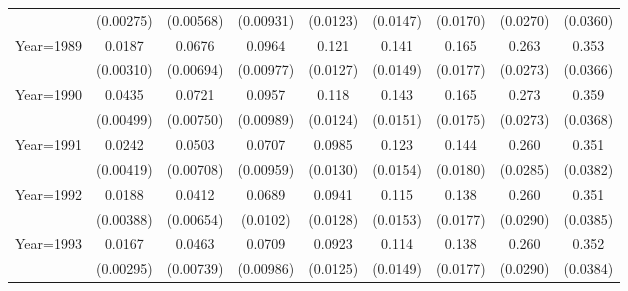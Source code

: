 \begin{table}[htbp]
\begin{tabular}{l*{8}{c}}
                    &   (0.00275)         &   (0.00568)         &   (0.00931)         &    (0.0123)         &    (0.0147)         &    (0.0170)         &    (0.0270)         &    (0.0360)         \\
[1em]
Year=1989           &      0.0187\sym{***}&      0.0676\sym{***}&      0.0964\sym{***}&       0.121\sym{***}&       0.141\sym{***}&       0.165\sym{***}&       0.263\sym{***}&       0.353\sym{***}\\
                    &   (0.00310)         &   (0.00694)         &   (0.00977)         &    (0.0127)         &    (0.0149)         &    (0.0177)         &    (0.0273)         &    (0.0366)         \\
[1em]
Year=1990           &      0.0435\sym{***}&      0.0721\sym{***}&      0.0957\sym{***}&       0.118\sym{***}&       0.143\sym{***}&       0.165\sym{***}&       0.273\sym{***}&       0.359\sym{***}\\
                    &   (0.00499)         &   (0.00750)         &   (0.00989)         &    (0.0124)         &    (0.0151)         &    (0.0175)         &    (0.0273)         &    (0.0368)         \\
[1em]
Year=1991           &      0.0242\sym{***}&      0.0503\sym{***}&      0.0707\sym{***}&      0.0985\sym{***}&       0.123\sym{***}&       0.144\sym{***}&       0.260\sym{***}&       0.351\sym{***}\\
                    &   (0.00419)         &   (0.00708)         &   (0.00959)         &    (0.0130)         &    (0.0154)         &    (0.0180)         &    (0.0285)         &    (0.0382)         \\
[1em]
Year=1992           &      0.0188\sym{***}&      0.0412\sym{***}&      0.0689\sym{***}&      0.0941\sym{***}&       0.115\sym{***}&       0.138\sym{***}&       0.260\sym{***}&       0.351\sym{***}\\
                    &   (0.00388)         &   (0.00654)         &    (0.0102)         &    (0.0128)         &    (0.0153)         &    (0.0177)         &    (0.0290)         &    (0.0385)         \\
[1em]
Year=1993           &      0.0167\sym{***}&      0.0463\sym{***}&      0.0709\sym{***}&      0.0923\sym{***}&       0.114\sym{***}&       0.138\sym{***}&       0.260\sym{***}&       0.352\sym{***}\\
                    &   (0.00295)         &   (0.00739)         &   (0.00986)         &    (0.0125)         &    (0.0149)         &    (0.0177)         &    (0.0290)         &    (0.0384)         \\

\end{tabular}
\end{table}
